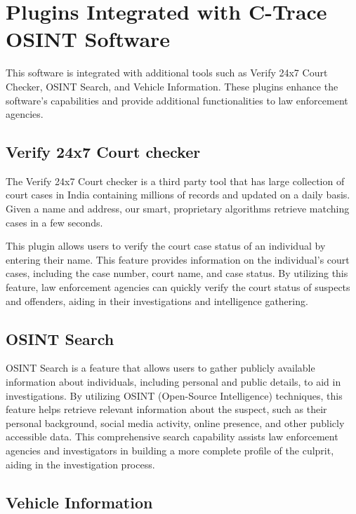 \section{Plugins Integrated with C-Trace OSINT Software}

This software is integrated with additional tools such as Verify 24x7 Court Checker, OSINT
Search, and Vehicle Information. These plugins enhance the software's capabilities and provide additional functionalities to law enforcement agencies.

\subsection{Verify 24x7 Court checker}

The Verify 24x7 Court checker is a third party tool that has large collection of court cases in India containing millions of records and updated on a daily basis. Given a name and address, our smart, proprietary algorithms retrieve matching cases in a few seconds.

This plugin allows users to verify the court case status of an individual by entering their name. This feature provides information on the individual's court cases, including the case number, court name, and case status. By utilizing this feature, law enforcement agencies can quickly verify the court status of suspects and offenders, aiding in their investigations and intelligence gathering.

\subsection{OSINT Search}

OSINT Search is a feature that allows users to gather publicly available information about individuals, including personal and public details, to aid in investigations. By utilizing OSINT (Open-Source Intelligence) techniques, this feature helps retrieve relevant information about the suspect, such as their personal background, social
media activity, online presence, and other publicly accessible data. This
comprehensive search capability assists law enforcement agencies and investigators in building a more complete profile of the culprit, aiding in the investigation process.

\subsection{Vehicle Information}

